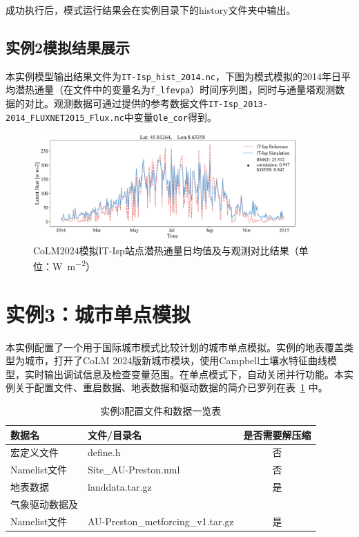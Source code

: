 成功执行后，模式运行结果会在实例目录下的history文件夹中输出。

\subsection{实例2模拟结果展示}

本实例模型输出结果文件为\texttt{IT-Isp\_hist\_2014.nc}，下图为模式模拟的2014年日平均潜热通量（在文件中的变量名为\texttt{f\_lfevpa}）时间序列图，同时与通量塔观测数据的对比。观测数据可通过提供的参考数据文件\texttt{IT-Isp\_2013-2014\_FLUXNET2015\_Flux.nc}中变量\texttt{Qle\_cor}得到。

\begin{figure}[htpb]
    \centering
    \includegraphics[width=0.90\textwidth]{figures/Example02_Site_IT-Isp.jpg}
    \caption{CoLM2024模拟IT-Isp站点潜热通量日均值及与观测对比结果（单位：\unit{W.m^{-2}}）}
    \label{fig:fig_example02_IT}
\end{figure}

\section{实例3：城市单点模拟}

本实例配置了一个用于国际城市模式比较计划的城市单点模拟。实例的地表覆盖类型为城市，打开了CoLM 2024版新城市模块，使用Campbell土壤水特征曲线模型，实时输出调试信息及检查变量范围。在单点模式下，自动关闭并行功能。本实例关于配置文件、重启数据、地表数据和驱动数据的简介已罗列在表~\ref{ex3table} 中。


\begin{table}[htbp]
\caption{实例3配置文件和数据一览表}
\centering \renewcommand{\arraystretch}{1.5}
\label{ex3table}
\begin{tabular}{llc}
\toprule
\textbf{数据名} & \textbf{文件/目录名} & \textbf{是否需要解压缩} \\

\midrule

宏定义文件 & define.h & 否 \\
Namelist文件 & Site\_AU-Preston.nml & 否 \\
地表数据 & landdata.tar.gz & 是 \\
气象驱动数据及\\Namelist文件 & AU-Preston\_metforcing\_v1.tar.gz & 是 \\

\bottomrule
\end{tabular}
\end{table}

